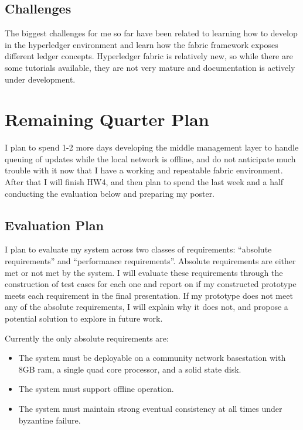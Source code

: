 \subsection{Challenges}

The biggest challenges for me so far have been related to learning how
to develop in the hyperledger environment and learn how the fabric
framework exposes different ledger concepts. Hyperledger fabric is
relatively new, so while there are some tutorials available, they are
not very mature and documentation is actively under development.

\section{Remaining Quarter Plan}

I plan to spend 1-2 more days developing the middle management layer
to handle queuing of updates while the local network is offline, and
do not anticipate much trouble with it now that I have a working and
repeatable fabric environment. After that I will finish HW4, and then
plan to spend the last week and a half conducting the evaluation below
and preparing my poster.

\subsection{Evaluation Plan}

I plan to evaluate my system across two classes of requirements:
``absolute requirements'' and ``performance requirements''. Absolute
requirements are either met or not met by the system. I will evaluate
these requirements through the construction of test cases for each one
and report on if my constructed prototype meets each requirement in
the final presentation. If my prototype does not meet any of the
absolute requirements, I will explain why it does not, and propose a
potential solution to explore in future work.

Currently the only absolute requirements are:
\begin{itemize}
\item The system must be deployable on a community network basestation
  with 8GB ram, a single quad core processor, and a solid state disk.
\item The system must support offline operation.
\item The system must maintain strong eventual consistency at all
  times under byzantine failure.
\end{itemize}

